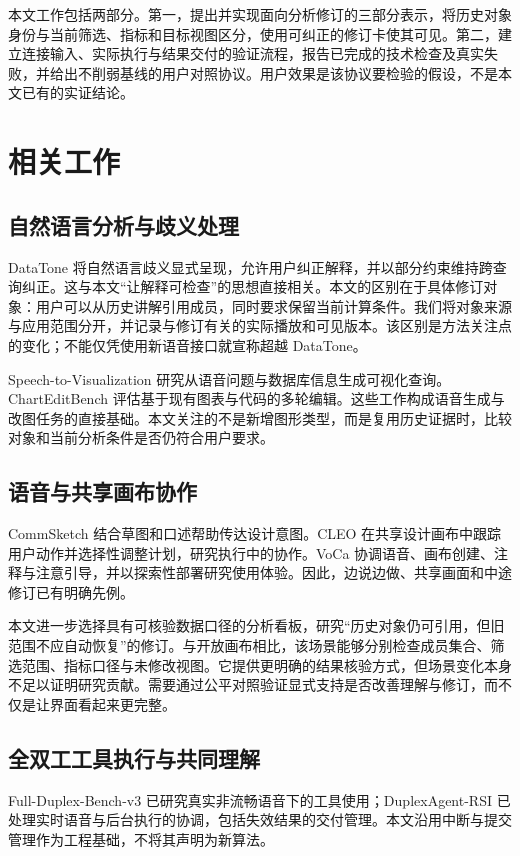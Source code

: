 \documentclass[conference]{IEEEtran}
\begin{document}
本文工作包括两部分。第一，提出并实现面向分析修订的三部分表示，将历史对象身份与当前筛选、指标和目标视图区分，使用可纠正的修订卡使其可见。第二，建立连接输入、实际执行与结果交付的验证流程，报告已完成的技术检查及真实失败，并给出不削弱基线的用户对照协议。用户效果是该协议要检验的假设，不是本文已有的实证结论。

\section{相关工作}
\subsection{自然语言分析与歧义处理}
DataTone 将自然语言歧义显式呈现，允许用户纠正解释，并以部分约束维持跨查询纠正\cite{datatone}。这与本文“让解释可检查”的思想直接相关。本文的区别在于具体修订对象：用户可以从历史讲解引用成员，同时要求保留当前计算条件。我们将对象来源与应用范围分开，并记录与修订有关的实际播放和可见版本。该区别是方法关注点的变化；不能仅凭使用新语音接口就宣称超越 DataTone。

Speech-to-Visualization 研究从语音问题与数据库信息生成可视化查询\cite{speechvis}。ChartEditBench 评估基于现有图表与代码的多轮编辑\cite{charteditbench}。这些工作构成语音生成与改图任务的直接基础。本文关注的不是新增图形类型，而是复用历史证据时，比较对象和当前分析条件是否仍符合用户要求。

\subsection{语音与共享画布协作}
CommSketch 结合草图和口述帮助传达设计意图\cite{commsketch}。CLEO 在共享设计画布中跟踪用户动作并选择性调整计划，研究执行中的协作\cite{cleo}。VoCa 协调语音、画布创建、注释与注意引导，并以探索性部署研究使用体验\cite{voca}。因此，边说边做、共享画面和中途修订已有明确先例。

本文进一步选择具有可核验数据口径的分析看板，研究“历史对象仍可引用，但旧范围不应自动恢复”的修订。与开放画布相比，该场景能够分别检查成员集合、筛选范围、指标口径与未修改视图。它提供更明确的结果核验方式，但场景变化本身不足以证明研究贡献。需要通过公平对照验证显式支持是否改善理解与修订，而不仅是让界面看起来更完整。

\subsection{全双工工具执行与共同理解}
Full-Duplex-Bench-v3 已研究真实非流畅语音下的工具使用\cite{fdbv3}；DuplexAgent-RSI 已处理实时语音与后台执行的协调，包括失效结果的交付管理\cite{duplexagent}。本文沿用中断与提交管理作为工程基础，不将其声明为新算法。
\end{document}
